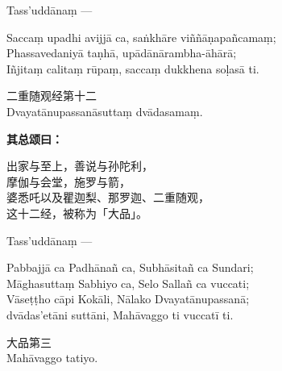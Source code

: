 Tass’uddānaṃ —

\begin{quoting}Saccaṃ upadhi avijjā ca, saṅkhāre viññāṇapañcamaṃ;\\
Phassavedaniyā taṇhā, upādānārambha-āhārā;\\
Iñjitaṃ calitaṃ rūpaṃ, saccaṃ dukkhena soḷasā ti.\end{quoting}

\begin{center}\vspace{1em}二重随观经第十二\\Dvayatānupassanāsuttaṃ dvādasamaṃ.\end{center}

\textbf{其总颂曰：}

\begin{quoting}出家与至上，善说与孙陀利，\\
摩伽与会堂，施罗与箭，\\
婆悉吒以及瞿迦梨、那罗迦、二重随观，\\
这十二经，被称为「大品」。\end{quoting}

Tass’uddānaṃ —

\begin{quoting}Pabbajjā ca Padhānañ ca, Subhāsitañ ca Sundari;\\
Māghasuttaṃ Sabhiyo ca, Selo Sallañ ca vuccati;\\
Vāseṭṭho cāpi Kokāli, Nālako Dvayatānupassanā;\\
dvādas’etāni suttāni, Mahāvaggo ti vuccatī ti.\end{quoting}

\begin{center}\vspace{1em}大品第三\\Mahāvaggo tatiyo.\end{center}

